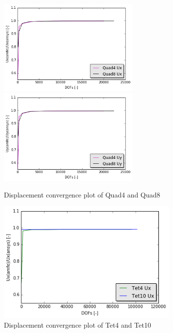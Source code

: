 \begin{figure}[htbp]
	\begin{center}	
		\includegraphics[width=7cm,clip]{QuadConPlotUx.png}
		\includegraphics[width=7cm,clip]{QuadConPlotUy.png} 	 			
		\caption{Displacement convergence plot of Quad4 and Quad8} \label{fig: QuadConPlot}
	\end{center}
\end{figure}

\begin{figure}[htbp]
	\begin{center}	
		\includegraphics[width=9cm,clip]{TetConPlotUx.png}	 			
		\caption{Displacement convergence plot of Tet4 and Tet10} \label{fig: TetConPlot}
	\end{center}
\end{figure}

